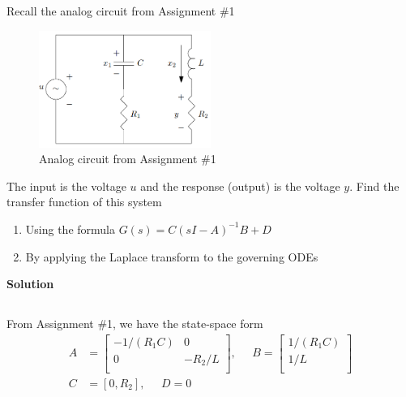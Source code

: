 \section{}
Recall the analog circuit from Assignment \#1

\begin{figure}[h]
    \centering
    \includegraphics[width=0.5\textwidth]{Questions/Figures/Q3ProblemDiagram.png}
    \caption{Analog circuit from Assignment \#1}
    \label{fig:Q3ProblemDiagram}
\end{figure}

The input is the voltage $u$ and the response (output) is the voltage $y$. Find the transfer function
of this system

\begin{enumerate}[label=(\alph*)]
    \item Using the formula $G(s) = C(sI - A)^{-1}B + D$
    \item By applying the Laplace transform to the governing ODEs
\end{enumerate}

\textbf{Solution}\\
\subsection{}
From Assignment \#1, we have the state-space form
\begin{align*}
    A &= 
    \begin{bmatrix}
        -1/(R_1 C) & 0 \\
        0 & -R_2/L \\
    \end{bmatrix}, \;\;\;\;\;
    B =
    \begin{bmatrix}
        1/(R_1 C) \\
        1/L \\
    \end{bmatrix} \\
    C &=
    [0, R_2], \;\;\;\;\;
    D = 0
\end{align*}


